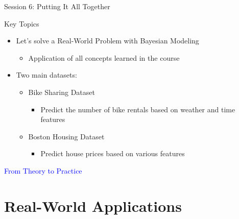 \documentclass{beamer}
\begin{document}
\begin{frame}{Session 6: Putting It All Together}
  \begin{block}{Key Topics}
    \begin{itemize}
      \item Let's solve a Real-World Problem with Bayesian Modeling
        \begin{itemize}
        \item Application of all concepts learned in the course
        \end{itemize}
      \item Two main datasets:
        \begin{itemize}
        \item Bike Sharing Dataset
          \begin{itemize}
          \item Predict the number of bike rentals based on weather and time features
          \end{itemize}
        \item Boston Housing Dataset
          \begin{itemize}
          \item Predict house prices based on various features
          \end{itemize}
        \end{itemize}
    \end{itemize}
  \end{block}
  \vfill
  \centering
  \textcolor{blue}{\large From Theory to Practice}
\end{frame}


\section{Real-World Applications}
\end{document}
